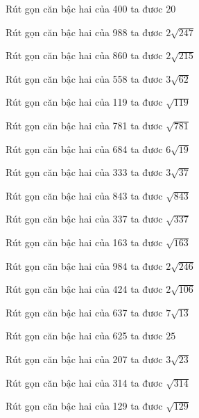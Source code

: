 \documentclass[12pt,a4paper]{article}
\begin{document}
\begin{ex}
Rút gọn căn bậc hai của 400 ta đươc $20$
\end{ex}
\begin{ex}
Rút gọn căn bậc hai của 988 ta đươc $2\sqrt{247}$
\end{ex}
\begin{ex}
Rút gọn căn bậc hai của 860 ta đươc $2\sqrt{215}$
\end{ex}
\begin{ex}
Rút gọn căn bậc hai của 558 ta đươc $3\sqrt{62}$
\end{ex}
\begin{ex}
Rút gọn căn bậc hai của 119 ta đươc $\sqrt{119}$
\end{ex}
\begin{ex}
Rút gọn căn bậc hai của 781 ta đươc $\sqrt{781}$
\end{ex}
\begin{ex}
Rút gọn căn bậc hai của 684 ta đươc $6\sqrt{19}$
\end{ex}
\begin{ex}
Rút gọn căn bậc hai của 333 ta đươc $3\sqrt{37}$
\end{ex}
\begin{ex}
Rút gọn căn bậc hai của 843 ta đươc $\sqrt{843}$
\end{ex}
\begin{ex}
Rút gọn căn bậc hai của 337 ta đươc $\sqrt{337}$
\end{ex}
\begin{ex}
Rút gọn căn bậc hai của 163 ta đươc $\sqrt{163}$
\end{ex}
\begin{ex}
Rút gọn căn bậc hai của 984 ta đươc $2\sqrt{246}$
\end{ex}
\begin{ex}
Rút gọn căn bậc hai của 424 ta đươc $2\sqrt{106}$
\end{ex}
\begin{ex}
Rút gọn căn bậc hai của 637 ta đươc $7\sqrt{13}$
\end{ex}
\begin{ex}
Rút gọn căn bậc hai của 625 ta đươc $25$
\end{ex}
\begin{ex}
Rút gọn căn bậc hai của 207 ta đươc $3\sqrt{23}$
\end{ex}
\begin{ex}
Rút gọn căn bậc hai của 314 ta đươc $\sqrt{314}$
\end{ex}
\begin{ex}
Rút gọn căn bậc hai của 129 ta đươc $\sqrt{129}$
\end{ex}
\end{document}

